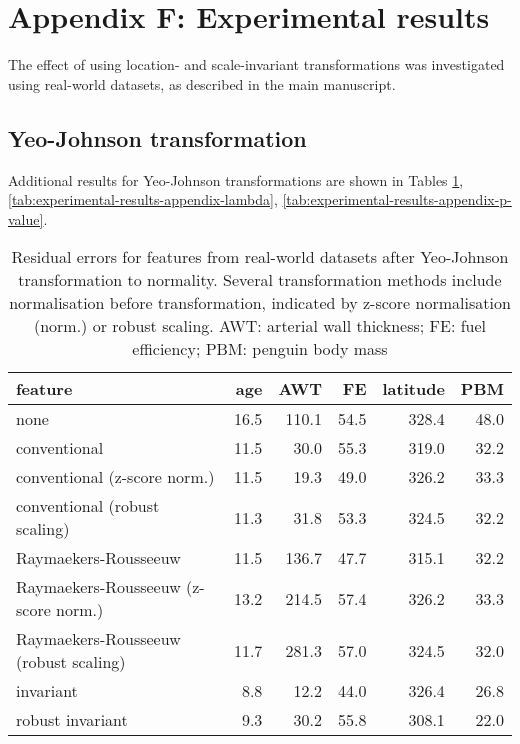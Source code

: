 \documentclass[
  a4paper,
]{article}
\begin{document}
\FloatBarrier

\section{Appendix F: Experimental
results}\label{appendix-f-experimental-results}

The effect of using location- and scale-invariant transformations was
investigated using real-world datasets, as described in the main
manuscript.

\subsection{Yeo-Johnson
transformation}\label{yeo-johnson-transformation}

Additional results for Yeo-Johnson transformations are shown in Tables
\ref{tab:experimental-results-appendix-residuals},
\ref{tab:experimental-results-appendix-lambda},
\ref{tab:experimental-results-appendix-p-value}.

\begin{table}
\begin{center}
\caption{Residual errors for features from real-world datasets after Yeo-Johnson transformation to normality. 
Several transformation methods include normalisation before transformation, indicated by z-score normalisation (norm.) or robust scaling. 
AWT: arterial wall thickness; FE: fuel efficiency; PBM: penguin body mass}
\label{tab:experimental-results-appendix-residuals}
\begin{tabular}{l | r r r r r}

\toprule
feature & age & AWT & FE & latitude & PBM \\

\midrule
none                                  & 16.5 & 110.1 & 54.5 & 328.4 & 48.0 \\
conventional                          & 11.5 &  30.0 & 55.3 & 319.0 & 32.2 \\
conventional (z-score norm.)          & 11.5 &  19.3 & 49.0 & 326.2 & 33.3 \\
conventional (robust scaling)         & 11.3 &  31.8 & 53.3 & 324.5 & 32.2 \\
Raymaekers-Rousseeuw                  & 11.5 & 136.7 & 47.7 & 315.1 & 32.2 \\
Raymaekers-Rousseeuw (z-score norm.)  & 13.2 & 214.5 & 57.4 & 326.2 & 33.3 \\
Raymaekers-Rousseeuw (robust scaling) & 11.7 & 281.3 & 57.0 & 324.5 & 32.0 \\
invariant                             &  8.8 &  12.2 & 44.0 & 326.4 & 26.8 \\
robust invariant                      &  9.3 &  30.2 & 55.8 & 308.1 & 22.0 \\

\bottomrule
\end{tabular}
\end{center}
\end{table}
\end{document}
